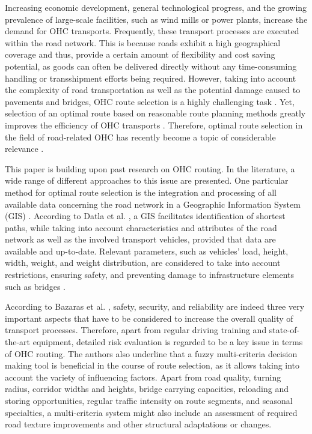 %

Increasing economic development, general technological progress, and the growing prevalence of large-scale facilities, such as wind mills or power plants, increase the demand for OHC transports.
Frequently, these transport processes are executed within the road network. This is because roads exhibit a high geographical coverage and thus, provide a certain amount of flexibility and cost saving potential, as goods can often be delivered directly without any time-consuming handling or transshipment efforts being required. However, taking into account the complexity of road transportation as well as the potential damage caused to pavements and bridges, OHC route selection is a highly challenging task \cite{Bazaras.2013, xu2001methodology, sivilevicius2007dynamics, fiorillo2016minimizing}. Yet, selection of an optimal route based on reasonable route planning methods greatly improves the efficiency of OHC transports \cite{meng2015optimized}.
Therefore, optimal route selection in the field of road-related OHC has recently become a topic of considerable relevance \cite{geisberger2011efficient}.
\par
This paper is building upon past research on OHC routing. In the literature, a wide range of different approaches to this issue are presented.
One particular method for optimal route selection is the integration and processing of all available data concerning the road network in a Geographic Information System (GIS) \cite{durham2002gis}.
According to Datla et al. \cite{datla2004gis}, a GIS facilitates identification of shortest paths, while taking into account characteristics and attributes of the road network as well as the involved transport vehicles, provided that data are available and up-to-date. Relevant parameters, such as vehicles' load, height, width, weight, and weight distribution, are considered to take into account restrictions, ensuring safety, and preventing damage to infrastructure elements such as bridges \cite{ecmt2006improving, vaitkus2016effect, kombe2017modelling, pauer2017development}.
\par
According to Bazaras et al. \cite{Bazaras.2013}, safety, security, and reliability are indeed three very important aspects that have to be considered to increase the overall quality of transport processes. Therefore, apart from regular driving training and state-of-the-art equipment, detailed risk evaluation is regarded to be a key issue in terms of OHC routing. The authors also underline that a fuzzy multi-criteria decision making tool is beneficial in the course of route selection, as it allows taking into account the variety of influencing factors. Apart from road quality, turning radius, corridor widths and heights, bridge carrying capacities, reloading and storing opportunities, regular traffic intensity on route segments, and seasonal specialties, a multi-criteria system might also include an assessment of required road texture improvements and other structural adaptations or changes.
